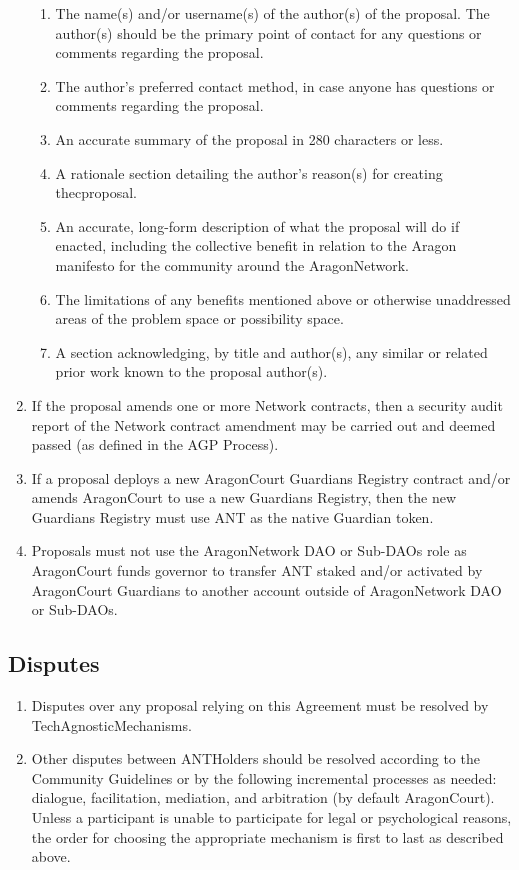 \begin{enumerate}
\begin{enumerate}
		\item The name(s) and/or username(s) of the author(s) of the proposal.
		The author(s) should be the primary point of contact for any questions or comments regarding the proposal.
		\item The author’s preferred contact method, in case anyone has questions or comments regarding the proposal.
		\item An accurate summary of the proposal in 280 characters or less.
		\item A rationale section detailing the author’s reason(s) for creating thecproposal.
		\item An accurate, long-form description of what the proposal will do if enacted, including the collective benefit in relation to the Aragon manifesto for the community around the \gls{AragonNetwork}.
		\item The limitations of any benefits mentioned above or otherwise unaddressed areas of the problem space or possibility space.
		\item A section acknowledging, by title and author(s), any similar or related prior work known to the proposal author(s).
	\end{enumerate}

	\item If the proposal amends one or more Network contracts, then a security audit report of the Network contract amendment may be carried out and deemed passed (as defined in the \ac{AGP} Process).
	\item If a proposal deploys a new \gls{AragonCourt} \glspl{Guardian} Registry contract and/or
	amends \gls{AragonCourt} to use a new \glspl{Guardian} Registry, then the new \glspl{Guardian} Registry must use \ac{ANT} as the native \gls{Guardian} token.
	\item Proposals must not use the \gls{AragonNetwork} \ac{DAO} or Sub-\acp{DAO} role as \gls{AragonCourt} funds governor to transfer \ac{ANT} staked and/or activated by \gls{AragonCourt} \glspl{Guardian} to another account outside of \gls{AragonNetwork} \ac{DAO} or Sub-\acp{DAO}.
\end{enumerate}

\subsection{Disputes}
\begin{enumerate}
	\item Disputes over any proposal relying on this Agreement must be resolved by \gls{TechAgnosticMechanisms}.
	\item Other disputes between \glspl{ANTHolder} should be resolved according to the Community Guidelines or by the following incremental processes as needed: dialogue, facilitation, mediation, and arbitration (by default \gls{AragonCourt}).
	Unless a participant is unable to participate for legal or psychological reasons, the order for choosing the appropriate mechanism is first to last as described above.
\end{enumerate}

